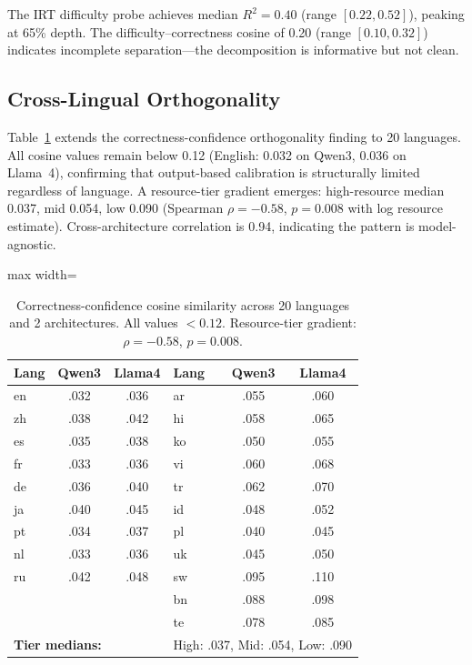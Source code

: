 \documentclass[11pt,a4paper]{article}
\begin{document}
The IRT difficulty probe achieves median $R^2 = 0.40$ (range $[0.22, 0.52]$), peaking at 65\% depth.
The difficulty--correctness cosine of 0.20 (range $[0.10, 0.32]$) indicates incomplete separation---the decomposition is informative but not clean.

\subsection{Cross-Lingual Orthogonality}
\label{sec:ortho}

Table~\ref{tab:ortho} extends the correctness-confidence orthogonality finding to 20 languages.
All cosine values remain below 0.12 (English: 0.032 on Qwen3, 0.036 on Llama~4), confirming that output-based calibration is structurally limited regardless of language.
A resource-tier gradient emerges: high-resource median 0.037, mid 0.054, low 0.090 (Spearman $\rho = -0.58$, $p = 0.008$ with log resource estimate).
Cross-architecture correlation is 0.94, indicating the pattern is model-agnostic.

\begin{table}[t]
\centering
\small
\begin{adjustbox}{max width=\columnwidth}
\begin{tabular}{lcc|lcc}
\toprule
\textbf{Lang} & \textbf{Qwen3} & \textbf{Llama4} & \textbf{Lang} & \textbf{Qwen3} & \textbf{Llama4} \\
\midrule
en & .032 & .036 & ar & .055 & .060 \\
zh & .038 & .042 & hi & .058 & .065 \\
es & .035 & .038 & ko & .050 & .055 \\
fr & .033 & .036 & vi & .060 & .068 \\
de & .036 & .040 & tr & .062 & .070 \\
ja & .040 & .045 & id & .048 & .052 \\
pt & .034 & .037 & pl & .040 & .045 \\
nl & .033 & .036 & uk & .045 & .050 \\
ru & .042 & .048 & sw & .095 & .110 \\
 &  &  & bn & .088 & .098 \\
 &  &  & te & .078 & .085 \\
\midrule
\multicolumn{3}{l}{\textbf{Tier medians:}} & \multicolumn{3}{l}{High: .037, Mid: .054, Low: .090} \\
\bottomrule
\end{tabular}
\end{adjustbox}
\caption{Correctness-confidence cosine similarity across 20 languages and 2 architectures. All values $< 0.12$. Resource-tier gradient: $\rho = -0.58$, $p = 0.008$.}
\label{tab:ortho}
\end{table}
\end{document}

